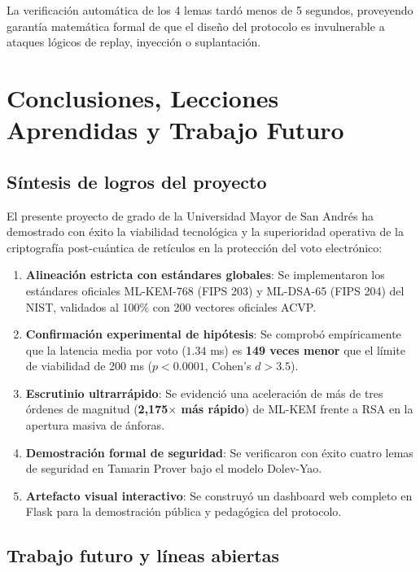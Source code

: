 \documentclass[11pt,a4paper,twoside,openright]{book}
\theoremstyle{plain}
\theoremstyle{definition}
\theoremstyle{remark}
\newcommand{\MLKEM}{\textsf{ML-KEM}}
\newcommand{\MLDSA}{\textsf{ML-DSA}}
\begin{document}
La verificaci\'on autom\'atica de los 4 lemas tard\'o menos de 5 segundos, proveyendo garant\'ia matem\'atica formal de que el dise\~no del protocolo es invulnerable a ataques l\'ogicos de replay, inyecci\'on o suplantaci\'on.

\chapter{Conclusiones, Lecciones Aprendidas y Trabajo Futuro}
\label{chap:conclusiones_finales}

\section{S\'intesis de logros del proyecto}

El presente proyecto de grado de la Universidad Mayor de San Andr\'es ha demostrado con \'exito la viabilidad tecnol\'ogica y la superioridad operativa de la criptograf\'ia post-cu\'antica de ret\'iculos en la protecci\'on del voto electr\'onico:

\begin{enumerate}
  \item \textbf{Alineaci\'on estricta con est\'andares globales}: Se implementaron los est\'andares oficiales \MLKEM{}-768 (FIPS 203) y \MLDSA{}-65 (FIPS 204) del NIST, validados al 100\% con 200 vectores oficiales ACVP.
  \item \textbf{Confirmaci\'on experimental de hip\'otesis}: Se comprob\'o emp\'iricamente que la latencia media por voto ($1.34$ ms) es \textbf{149 veces menor} que el l\'imite de viabilidad de 200 ms ($p < 0.0001$, Cohen's $d > 3.5$).
  \item \textbf{Escrutinio ultrarr\'apido}: Se evidenci\'o una aceleraci\'on de m\'as de tres \'ordenes de magnitud (\textbf{2,175$\times$ m\'as r\'apido}) de \MLKEM{} frente a RSA en la apertura masiva de \'anforas.
  \item \textbf{Demostraci\'on formal de seguridad}: Se verificaron con \'exito cuatro lemas de seguridad en Tamarin Prover bajo el modelo Dolev-Yao.
  \item \textbf{Artefacto visual interactivo}: Se construy\'o un dashboard web completo en Flask para la demostraci\'on p\'ublica y pedag\'ogica del protocolo.
\end{enumerate}

\section{Trabajo futuro y l\'ineas abiertas}
\end{document}
